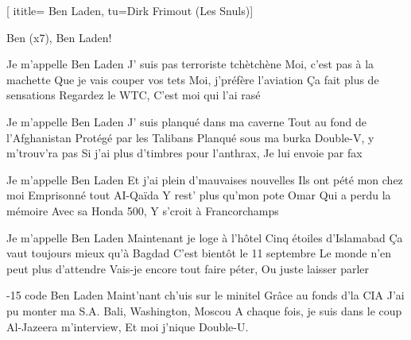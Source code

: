 [
ititle= {Ben Laden},
tu={Dirk Frimout (Les Snuls)}]


\beginchorus
{}
Ben (x7), Ben Laden!
\endchorus

\beginverse
Je m'appelle Ben Laden
J' suis pas terroriste tchètchène
Moi, c'est pas à la machette
Que je vais couper vos tets
Moi, j’préfère l'aviation
Ça fait plus de sensations
Regardez le WTC,
C'est moi qui l'ai rasé
\endverse

\beginverse
Je m'appelle Ben Laden
J' suis planqué dans ma caverne
Tout au fond de l’Afghanistan
Protégé par les Talibans
Planqué sous ma burka
Double-V, y m'trouv’ra pas
Si j'ai plus d’timbres pour l'anthrax,
Je lui envoie par fax
\endverse

\beginverse
Je m'appelle Ben Laden
Et j'ai plein d’mauvaises nouvelles
Ils ont pété mon chez moi
Emprisonné tout AI-Qaïda
Y rest’ plus qu’mon pote Omar
Qui a perdu la mémoire
Avec sa Honda 500,
Y s’croit à Francorchamps
\endverse

\beginverse
Je m'appelle Ben Laden
Maintenant je loge à l'hôtel
Cinq étoiles d'Islamabad
Ça vaut toujours mieux qu’à Bagdad
C'est bientôt le 11 septembre
Le monde n'en peut plus d'attendre
Vais-je encore tout faire péter,
Ou juste laisser parler
\endverse

-15 code Ben Laden
Maint’nant ch’uis sur le minitel
Grâce au fonds d'la CIA
J'ai pu monter ma S.A.
Bali, Washington, Moscou
A chaque fois, je suis dans le coup
Al-Jazeera m'interview,
Et moi j'nique Double-U.
\endverse

\endsong